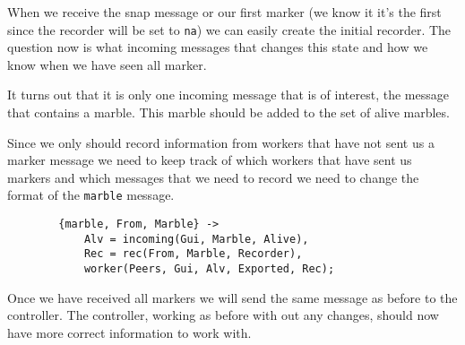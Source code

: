 \documentclass[a4paper,11pt]{article}
\begin{document}
When we receive the snap message or our first marker (we know it it's
the first since the recorder will be set to {\tt na}) we can easily
create the initial recorder. The question now is what incoming
messages that changes this state and how we know when we have seen all
marker.



It turns out that it is only one incoming message that is of
interest, the message that contains a marble. This marble should be added
to the set of alive marbles.

Since we only should record information from workers that have not
sent us a marker message we need to keep track of which workers that
have sent us markers and which messages that we need to record we need
to change the format of the {\tt marble} message. 

\begin{verbatim}
        {marble, From, Marble} ->
            Alv = incoming(Gui, Marble, Alive),
            Rec = rec(From, Marble, Recorder),
            worker(Peers, Gui, Alv, Exported, Rec);
\end{verbatim}


Once we have received all markers we will send the same message as
before to the controller. The controller, working as before with out
any changes, should now have more correct information to work with.
\end{document}
